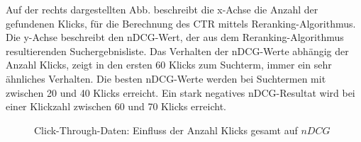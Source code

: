 \begin{minipage}{0.40\linewidth}
Auf der rechts dargestellten Abb. beschreibt die x-Achse die Anzahl der gefundenen Klicks, für die Berechnung des CTR mittels Reranking-Algorithmus. Die y-Achse beschreibt den nDCG-Wert, der aus dem Reranking-Algorithmus resultierenden Suchergebnisliste. Das Verhalten der nDCG-Werte abhängig der Anzahl Klicks, zeigt in den ersten 60 Klicks zum Suchterm, immer ein sehr ähnliches Verhalten. Die besten nDCG-Werte werden bei Suchtermen mit zwischen 20 und 40 Klicks erreicht. Ein stark negatives nDCG-Resultat wird bei einer Klickzahl zwischen 60 und 70 Klicks erreicht.
\end{minipage}
\hfill
\begin{minipage}{0.55\linewidth}
\begin{figure}[H]
\centering 
\vspace{-1em}
\caption[Click-Through-Daten: Einfluss der Anzahl Klicks gesamt auf $nDCG$]{Click-Through-Daten: Einfluss der Anzahl Klicks gesamt auf $nDCG$}
\label{fig:Evaluation:Auswertung:ClicksNDCG}

\footnotesize
{}\clicks
\pgfsetplotmarksize{.0pt}
  

\vspace{-2.5em}
\end{figure}
\end{minipage}


